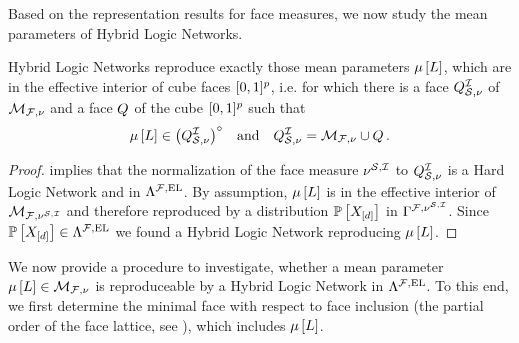 Based on the representation results for face measures, we now study the mean parameters of Hybrid Logic Networks.

\begin{theorem}
    \label{the:hlnInteriorCharacterization}
    Hybrid Logic Networks reproduce exactly those mean parameters $\mu\left[L\right]$, which are in the effective interior of cube faces $[0,1]^{p}$, i.e. for which there is a face $Q^{\mathcal{I}}_{\mathcal{S},\nu}$ of $\mathcal{M}_{\mathcal{F},\nu}$ and a face $Q$ of the cube $[0,1]^{p}$ such that
    \begin{align*}
        \mu\left[L\right]\in{\left(Q^{\mathcal{I}}_{\mathcal{S},\nu}\right)}^{\circ} \quad\text{and}\quad Q^{\mathcal{I}}_{\mathcal{S},\nu} = \mathcal{M}_{\mathcal{F},\nu}\cup Q \, .
    \end{align*}
\end{theorem}
\begin{proof}
     implies that the normalization of the face measure $\nu^{\mathcal{S},\mathcal{I}}$ to $Q^{\mathcal{I}}_{\mathcal{S},\nu}$ is a Hard Logic Network and in $\Lambda^{\mathcal{F},\mathrm{EL}}$.
    By assumption, $\mu\left[L\right]$ is in the effective interior of $\mathcal{M}_{\mathcal{F},\nu^{\mathcal{S},\mathcal{I}}}$ and therefore reproduced by a distribution $\mathbb{P}\left[X_{[d]}\right]$ in $\Gamma^{\mathcal{F},\nu^{\mathcal{S},\mathcal{I}}}$.
    Since $\mathbb{P}\left[X_{[d]}\right]\in\Lambda^{\mathcal{F},\mathrm{EL}}$ we found a Hybrid Logic Network reproducing $\mu\left[L\right]$.
\end{proof}

We now provide a procedure to investigate, whether a mean parameter $\mu\left[L\right]\in\mathcal{M}_{\mathcal{F},\nu}$ is reproduceable by a Hybrid Logic Network in $\Lambda^{\mathcal{F},\mathrm{EL}}$.
To this end, we first determine the minimal face with respect to face inclusion (the partial order of the face lattice, see \cite{ziegler_lectures_2013}), which includes $\mu\left[L\right]$.

